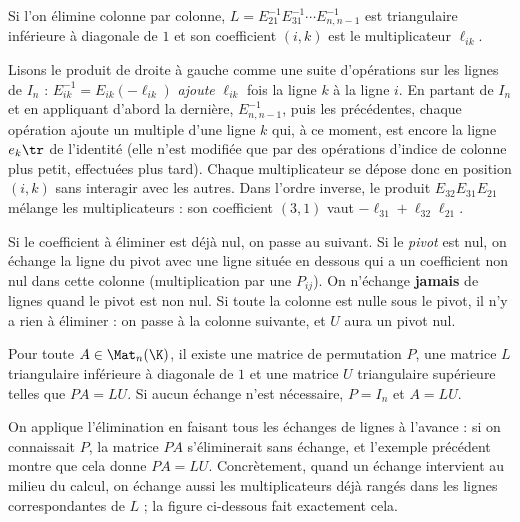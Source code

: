 \begin{proposition}
Si l'on élimine colonne par colonne, $L=E_{21}^{-1}E_{31}^{-1}\cdots E_{n,n-1}^{-1}$ est triangulaire inférieure à diagonale de $1$ et son coefficient $(i,k)$ est le multiplicateur $\ell_{ik}$.
\end{proposition}
\begin{preuve}
Lisons le produit de droite à gauche comme une suite d'opérations sur les lignes de $I_n$ : $E_{ik}^{-1}=E_{ik}(-\ell_{ik})$ \emph{ajoute} $\ell_{ik}$ fois la ligne $k$ à la ligne $i$. En partant de $I_n$ et en appliquant d'abord la dernière, $E_{n,n-1}^{-1}$, puis les précédentes, chaque opération ajoute un multiple d'une ligne $k$ qui, à ce moment, est encore la ligne $e_k\tr$ de l'identité (elle n'est modifiée que par des opérations d'indice de colonne plus petit, effectuées plus tard). Chaque multiplicateur se dépose donc en position $(i,k)$ sans interagir avec les autres. Dans l'ordre inverse, le produit $E_{32}E_{31}E_{21}$ mélange les multiplicateurs : son coefficient $(3,1)$ vaut $-\ell_{31}+\ell_{32}\ell_{21}$.
\end{preuve}
\begin{remarque}
Si le coefficient à éliminer est déjà nul, on passe au suivant. Si le \emph{pivot} est nul, on échange la ligne du pivot avec une ligne située en dessous qui a un coefficient non nul dans cette colonne (multiplication par une $P_{ij}$). On n'échange \textbf{jamais} de lignes quand le pivot est non nul. Si toute la colonne est nulle sous le pivot, il n'y a rien à éliminer : on passe à la colonne suivante, et $U$ aura un pivot nul.
\end{remarque}
\begin{theoreme}[Factorisation $PA=LU$]\label{thm-lu}
Pour toute $A\in\Mat_n(\K)$, il existe une matrice de permutation $P$, une matrice $L$ triangulaire inférieure à diagonale de $1$ et une matrice $U$ triangulaire supérieure telles que $PA=LU$. Si aucun échange n'est nécessaire, $P=I_n$ et $A=LU$.
\end{theoreme}
\begin{preuve}
On applique l'élimination en faisant tous les échanges de lignes \og à l'avance \fg : si on connaissait $P$, la matrice $PA$ s'éliminerait sans échange, et l'exemple précédent montre que cela donne $PA=LU$. Concrètement, quand un échange intervient au milieu du calcul, on échange aussi les multiplicateurs déjà rangés dans les lignes correspondantes de $L$ ; la figure ci-dessous fait exactement cela.
\end{preuve}
